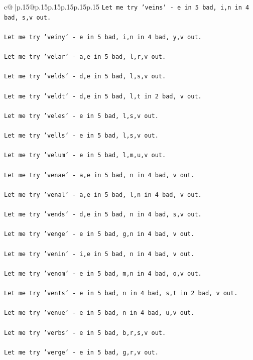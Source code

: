 \documentclass{article}
\begin{document}
{\begin{supertabular}{c@{$\;$}|p{.15\linewidth}@{}p{.15\linewidth}p{.15\linewidth}p{.15\linewidth}p{.15\linewidth}p{.15\linewidth}}
{{{\texttt{Let me try 'veins' {-} e in 5 bad, i,n in 4 bad, s,v out. } \\
\\ 
\texttt{Let me try 'veiny' {-} e in 5 bad, i,n in 4 bad, y,v out. } \\
\\ 
\texttt{Let me try 'velar' {-} a,e in 5 bad, l,r,v out. } \\
\\ 
\texttt{Let me try 'velds' {-} d,e in 5 bad, l,s,v out. } \\
\\ 
\texttt{Let me try 'veldt' {-} d,e in 5 bad, l,t in 2 bad, v out. } \\
\\ 
\texttt{Let me try 'veles' {-} e in 5 bad, l,s,v out. } \\
\\ 
\texttt{Let me try 'vells' {-} e in 5 bad, l,s,v out. } \\
\\ 
\texttt{Let me try 'velum' {-} e in 5 bad, l,m,u,v out. } \\
\\ 
\texttt{Let me try 'venae' {-} a,e in 5 bad, n in 4 bad, v out. } \\
\\ 
\texttt{Let me try 'venal' {-} a,e in 5 bad, l,n in 4 bad, v out. } \\
\\ 
\texttt{Let me try 'vends' {-} d,e in 5 bad, n in 4 bad, s,v out. } \\
\\ 
\texttt{Let me try 'venge' {-} e in 5 bad, g,n in 4 bad, v out. } \\
\\ 
\texttt{Let me try 'venin' {-} i,e in 5 bad, n in 4 bad, v out. } \\
\\ 
\texttt{Let me try 'venom' {-} e in 5 bad, m,n in 4 bad, o,v out. } \\
\\ 
\texttt{Let me try 'vents' {-} e in 5 bad, n in 4 bad, s,t in 2 bad, v out. } \\
\\ 
\texttt{Let me try 'venue' {-} e in 5 bad, n in 4 bad, u,v out. } \\
\\ 
\texttt{Let me try 'verbs' {-} e in 5 bad, b,r,s,v out. } \\
\\ 
\texttt{Let me try 'verge' {-} e in 5 bad, g,r,v out. } \\
}}}
\end{supertabular}}
\end{document}
